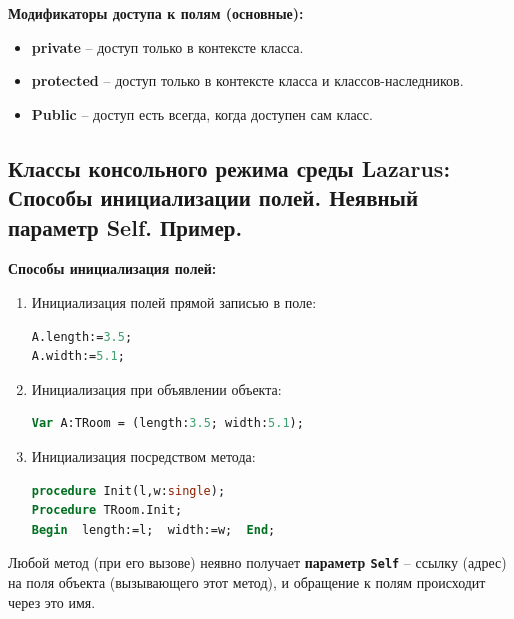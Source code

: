 \vspace*{10pt}

\noindent
{\bf Модификаторы доступа к полям (основные):}
\begin{itemize}
\item {\bf private} – доступ только в контексте класса.

\item {\bf protected} – доступ только в контексте класса и классов-наследников.

\item {\bf Public} – доступ есть всегда, когда доступен сам класс.
\end{itemize}



\newpage\subsection{Классы консольного режима  среды  Lazarus: Способы инициализации полей. Неявный параметр Self. Пример. }

\begin{myquote}
            
\end{myquote}

\noindent
{\bf {Способы инициализация полей:}}
\begin{enumerate}
\item Инициализация полей прямой записью в поле:

\begin{lstlisting}[language=Pascal]
A.length:=3.5;
A.width:=5.1;
\end{lstlisting}

\item Инициализация при объявлении объекта: 
\begin{lstlisting}[language=Pascal]
Var A:TRoom = (length:3.5; width:5.1);
\end{lstlisting}

\item Инициализация посредством метода:
\begin{lstlisting}[language=Pascal]
procedure Init(l,w:single);
Procedure TRoom.Init;
Begin  length:=l;  width:=w;  End;
\end{lstlisting}

\end{enumerate}

Любой метод (при его вызове) неявно получает {\bf{параметр {\tt Self}}} – ссылку (адрес) на 
поля объекта (вызывающего этот метод), и обращение к полям происходит через это имя.


